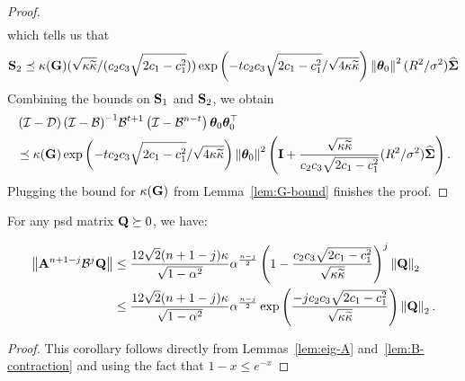\begin{proof}
\begin{align*}
	\end{align*}
	which tells us that 
	\begin{align*}
	\S_2 \preceq \kappa(\G) (\sqrt{\cnH\cnS}/(\ctwo\cthree\sqrt{2\cone-\cone^2}))  \exp\left(-t \ctwo \cthree \sqrt{2\cone - \cone^2}/\sqrt{4 \cnH\cnS}\right) \norm{\thetat[0]}^2 (\infbound/\sigma^2) \Sighat
	\end{align*} 
	Combining the bounds on $\S_1$ and $\S_2$, we obtain
	\begin{align*}
		&\left(\eyeT - \D\right) \inv{\left(\eyeT - \B \right)} \B^{t+1} \left(\eyeT - \B^{n-t}\right) \thetat[0]\thetat[0]\T \nonumber\\&\preceq \kappa(\G) \exp\left(- t \ctwo \cthree \sqrt{2\cone - \cone^2}/\sqrt{4 \cnH\cnS}\right) \norm{\thetat[0]}^2 \left(\eye + \frac{\sqrt{\cnH\cnS}}{\ctwo\cthree\sqrt{2\cone-\cone^2}} (\infbound/\sigma^2) \Sighat \right).
	\end{align*}
	Plugging the bound for $\kappa(\G)$ from Lemma~\ref{lem:G-bound} finishes the proof.
\end{proof}
\begin{corollary}\label{cor:bias-tail1}
For any psd matrix $\Q\succeq0$, we have:
\iffalse
	\begin{align*}
		\norm{\A^{n+1-j} \B^j \thetat[0] \thetat[0]\T} &\leq \frac{12\sqrt{2}(n+1-j)\cnH}{\sqrt{1-\alpha^2}} \alpha^{\frac{n-j}{2}} \left(1-\frac{ \ctwo \cthree \sqrt{2\cone-\cone^2} }{\sqrt{\cnH\cnS}}\right)^j \twonorm{\thetat[0]}^2\\
		&\leq\frac{12\sqrt{2}(n+1-j)\cnH}{\sqrt{1-\alpha^2}} \alpha^{\frac{n-j}{2}} \exp\left(\frac{-j \ctwo \cthree \sqrt{2\cone-\cone^2} }{\sqrt{\cnH\cnS}}\right) \twonorm{\thetat[0]}^2.
	\end{align*}
\fi
	\begin{align*}
		\norm{\A^{n+1-j} \B^j \Q} &\leq \frac{12\sqrt{2}(n+1-j)\cnH}{\sqrt{1-\alpha^2}} \alpha^{\frac{n-j}{2}} \left(1-\frac{ \ctwo \cthree \sqrt{2\cone-\cone^2} }{\sqrt{\cnH\cnS}}\right)^j \twonorm{\Q}\\
		&\leq\frac{12\sqrt{2}(n+1-j)\cnH}{\sqrt{1-\alpha^2}} \alpha^{\frac{n-j}{2}} \exp\left(\frac{-j \ctwo \cthree \sqrt{2\cone-\cone^2} }{\sqrt{\cnH\cnS}}\right) \twonorm{\Q}.
	\end{align*}
\end{corollary}
\begin{proof}
	This corollary follows directly from Lemmas~\ref{lem:eig-A} and~\ref{lem:B-contraction} and using the fact that $1-x\leq e^{-x}$
\end{proof}

